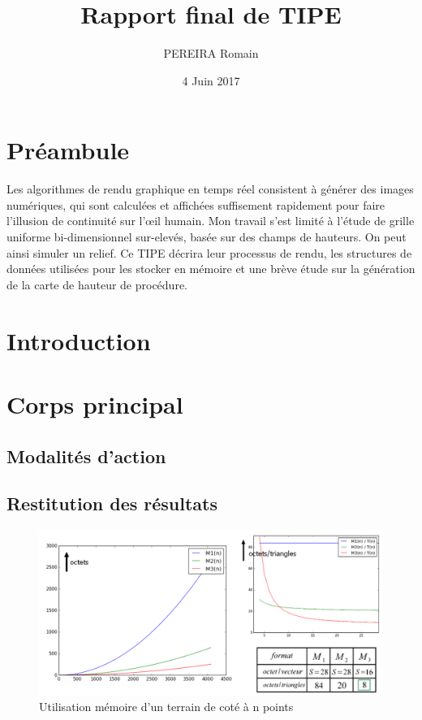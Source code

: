 \documentclass{article}
\title{Rapport final de TIPE}
\author{PEREIRA Romain}
\date{4 Juin 2017}
\begin{document}
	\maketitle

	\tableofcontents

	\section*{Préambule}
		Les algorithmes de rendu graphique en temps réel consistent à générer des images numériques, qui sont calculées et affichées suffisement rapidement pour faire l'illusion de continuité sur l'œil humain.
		\newline
		\newline
		Mon travail s'est limité à l'étude de grille uniforme bi-dimensionnel sur-elevés, basée sur des champs de hauteurs. On peut ainsi simuler un relief. 
		Ce TIPE décrira leur processus de rendu, les structures de données utilisées pour les stocker en mémoire et une brève étude sur la génération de la carte de hauteur de procédure.

	\section{Introduction}


	\newpage

	\section{Corps principal}
		\subsection{Modalités d'action}
			
		\subsection{Restitution des résultats}
			\begin{figure}[!h]
				\begin{center}
					\includegraphics[width=\textwidth,height=\textheight,keepaspectratio]{../images/complexiteSpatial5.png}
				\end{center}
				\caption{Utilisation mémoire d'un terrain de coté à n points}
				\label{Utilisation mémoire du terrain}
			\end{figure}
\end{document}
